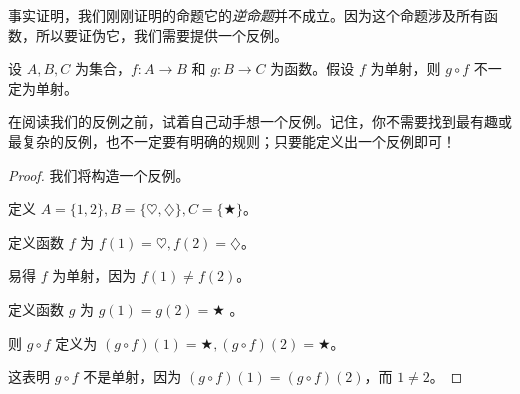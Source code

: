 事实证明，我们刚刚证明的命题它的\emph{逆命题}并不成立。因为这个命题涉及所有函数，所以要证伪它，我们需要提供一个反例。

\begin{proposition}
    设 $A, B, C$ 为集合，$f : A \to B$ 和 $g : B \to C$ 为函数。假设 $f$ 为单射，则 $g \circ f$ 不一定为单射。
\end{proposition}

在阅读我们的反例之前，试着自己动手想一个反例。记住，你不需要找到最有趣或最复杂的反例，也不一定要有明确的规则；只要能定义出一个反例即可！

\begin{proof}
    我们将构造一个反例。

    定义 $A = \{1, 2\}, B = \{\heartsuit, \diamondsuit\}, C = \{\bigstar\}$。

    定义函数 $f$ 为 $f(1) = \heartsuit, f(2) = \diamondsuit$。

    易得 $f$ 为单射，因为 $f(1) \ne f(2)$。

    定义函数 $g$ 为 $g(1) = g(2) = \bigstar$ 。

    则 $g \circ f$ 定义为 $(g \circ f)(1) = \bigstar, (g \circ f)(2) = \bigstar$。
    
    这表明 $g \circ f$ 不是单射，因为 $(g \circ f)(1) = (g \circ f)(2)$，而 $1 \ne 2$。
\end{proof}